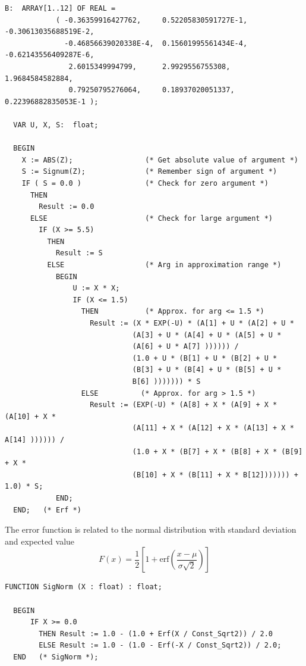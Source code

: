 \begin{refsection}
\begin{lstlisting}[caption=Error function]
        B:  ARRAY[1..12] OF REAL =
            ( -0.36359916427762,     0.52205830591727E-1, -0.30613035688519E-2,
              -0.46856639020338E-4,  0.15601995561434E-4, -0.62143556409287E-6,
               2.6015349994799,      2.9929556755308,      1.9684584582884,
               0.79250795276064,     0.18937020051337,     0.22396882835053E-1 );

  VAR U, X, S:  float;

  BEGIN
    X := ABS(Z);                 (* Get absolute value of argument *)
    S := Signum(Z);              (* Remember sign of argument *)
    IF ( S = 0.0 )               (* Check for zero argument *)
      THEN
        Result := 0.0
      ELSE                       (* Check for large argument *)
        IF (X >= 5.5)
          THEN
            Result := S
          ELSE                   (* Arg in approximation range *)
            BEGIN
                U := X * X;
                IF (X <= 1.5)
                  THEN           (* Approx. for arg <= 1.5 *)
                    Result := (X * EXP(-U) * (A[1] + U * (A[2] + U *
                              (A[3] + U * (A[4] + U * (A[5] + U *
                              (A[6] + U * A[7] )))))) /
                              (1.0 + U * (B[1] + U * (B[2] + U *
                              (B[3] + U * (B[4] + U * (B[5] + U *
                              B[6] ))))))) * S
                  ELSE          (* Approx. for arg > 1.5 *)
                    Result := (EXP(-U) * (A[8] + X * (A[9] + X * (A[10] + X *
                              (A[11] + X * (A[12] + X * (A[13] + X * A[14] )))))) /
                              (1.0 + X * (B[7] + X * (B[8] + X * (B[9] + X *
                              (B[10] + X * (B[11] + X * B[12])))))) + 1.0) * S;
            END;
  END;   (* Erf *)
\end{lstlisting}

The error function is related to the normal distribution with standard deviation \skalar{\sigma} and expected value \skalar{\mu}
\begin{equation}
  F(x) = \frac{1}{2} \left[ 1 + \mathrm{erf}\left( \frac{x-\mu}{\sigma \sqrt{2}} \right) \right]
\end{equation}

\begin{lstlisting}[caption=Tail probability of normal distribution]
  FUNCTION SigNorm (X : float) : float;

  BEGIN
      IF X >= 0.0
        THEN Result := 1.0 - (1.0 + Erf(X / Const_Sqrt2)) / 2.0
        ELSE Result := 1.0 - (1.0 - Erf(-X / Const_Sqrt2)) / 2.0;
  END   (* SigNorm *);
\end{lstlisting}


\end{refsection}
